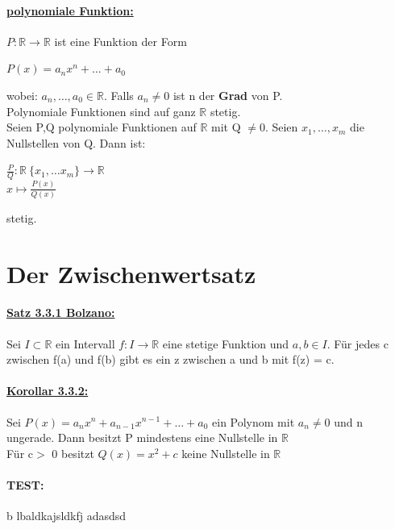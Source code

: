 \documentclass[8pt]{extreport}
\begin{document}
\paragraph{\underline{polynomiale Funktion:}} $P: \mathbb{R} \rightarrow \mathbb{R}$ ist eine Funktion der Form
\begin{center}
$P(x) = a_nx^n+ \dots + a_0$
\end{center}
wobei: $a_n, \dots, a_0 \in \mathbb{R}.$ Falls $a_n \neq 0$ ist n der \textbf{Grad} von P.\\
Polynomiale Funktionen sind auf ganz $\mathbb{R}$ stetig.\\
Seien P,Q polynomiale Funktionen auf $ \mathbb{R}$ mit Q $\neq \mathit{0}$. Seien $x_1,\dots,x_m$ die Nullstellen von Q. Dann ist:
\begin{center}
$\frac{P}{Q} : \mathbb{R} \ \{x_1,\dots x_m\} \rightarrow \mathbb{R}$\\
$ x \mapsto \frac{P(x)}{Q(x)}$

\end{center}
stetig.
\section{Der Zwischenwertsatz}
\paragraph{\underline{Satz 3.3.1 Bolzano:}} Sei $I \subset \mathbb{R}$ ein Intervall $f:I \rightarrow \mathbb{R}$ eine stetige Funktion und $a,b \in I$. Für jedes c zwischen f(a) und f(b) gibt es ein z zwischen a und b mit f(z) = c.
\paragraph{\underline{Korollar 3.3.2:}} Sei $P(x) = a_nx^n + a_{n-1}x^{n-1} + \dots + a_0$ ein Polynom mit $a_n \neq 0$ und n ungerade. Dann besitzt P mindestens eine Nullstelle in $\mathbb{R}$\\
Für c$>$ 0 besitzt $Q(x) = x^2 + c$ keine Nullstelle in $\mathbb{R}$

\paragraph{TEST:}b lbaldkajsldkfj adasdsd
\end{document}
